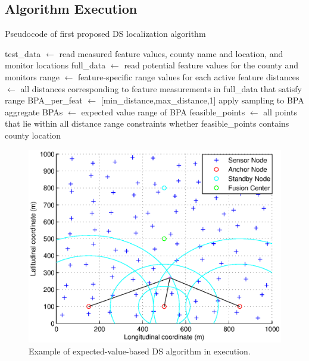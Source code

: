 \documentclass[12pt]{uthesis-v12}  %
\begin{document}
\subsection{Algorithm Execution}

\begin{algorithm}
\caption{Pseudocode of first proposed DS localization algorithm} \label{alg}
\begin{algorithmic}[1]
\STATE test\_data $\leftarrow$ read measured feature values, county name and location, and monitor locations
\STATE full\_data $\leftarrow$ read potential feature values for the county and monitors
\STATE range $\leftarrow$ feature-specific range values for each active feature
		\STATE distances $\leftarrow$ all distances corresponding to feature measurements in full\_data that satisfy range
		\STATE BPA\_per\_feat $\leftarrow$ [min\_distance,max\_distance,1]
		\STATE apply sampling to BPA
	\ENDFOR
	\STATE aggregate BPAs
	 $\leftarrow$ expected value range of BPA
\ENDFOR
\STATE feasible\_points $\leftarrow$ all points that lie within all distance range constraints
\RETURN whether feasible\_points contains county location

\label{dst1}
\end{algorithmic}
\end{algorithm}

\begin{figure}[!t]
\centering
\includegraphics[width=6in]{wsn-plot2}
\caption{Example of expected-value-based DS algorithm in execution.}
\label{demo}
\end{figure}
\end{document}
